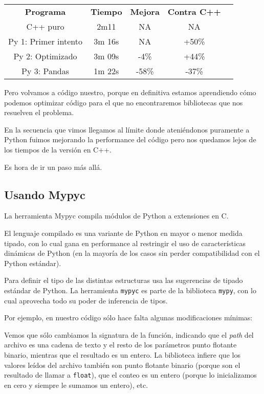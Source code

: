 \begin{center}
 \begin{tabular} {ccccc} 
 \toprule
  \textbf{Programa} & \textbf{Tiempo} & \textbf{Mejora} & \textbf{Contra C++} \\ 
  C++ puro & 2m11 & NA & NA \\
  Py 1: Primer intento & 3m 16s & NA & +50\% \\
  Py 2: Optimizado & 3m 09s & -4\% & +44\% \\
  Py 3: Pandas & 1m 22s & -58\% & -37\% \\
  \bottomrule
 \end{tabular}
\end{center}

Pero volvamos a código nuestro, porque en definitiva estamos aprendiendo cómo podemos optimizar código para el que no encontraremos bibliotecas que nos resuelven el problema. 

En la secuencia que vimos llegamos al límite donde ateniéndonos puramente a Python fuimos mejorando la performance del código pero nos quedamos lejos de los tiempos de la versión en C++.

Es hora de ir un paso más allá.


\subsection{Usando Mypyc}

La herramienta Mypyc compila módulos de Python a extensiones en C.

El lenguaje compilado es una variante de Python en mayor o menor medida tipado, con lo cual gana en performance al restringir el uso de características dinámicas de Python (en la mayoría de los casos sin perder compatibilidad con el Python estándar).

Para definir el tipo de las distintas estructuras usa las sugerencias de tipado estándar de Python. La herramienta \texttt{mypyc} es parte de la biblioteca \texttt{mypy}, con lo cual aprovecha todo su poder de inferencia de tipos. 

Por ejemplo, en nuestro código sólo hace falta algunas modificaciones mínimas:


Vemos que sólo cambiamos la signatura de la función, indicando que el \textit{path} del archivo es una cadena de texto y el resto de los parámetros punto flotante binario, mientras que el resultado es un entero. La biblioteca infiere que los valores leídos del archivo también son punto flotante binario (porque son el resultado de llamar a \texttt{float}), que el conteo es un entero (porque lo inicializamos en cero y siempre le sumamos un entero), etc.

